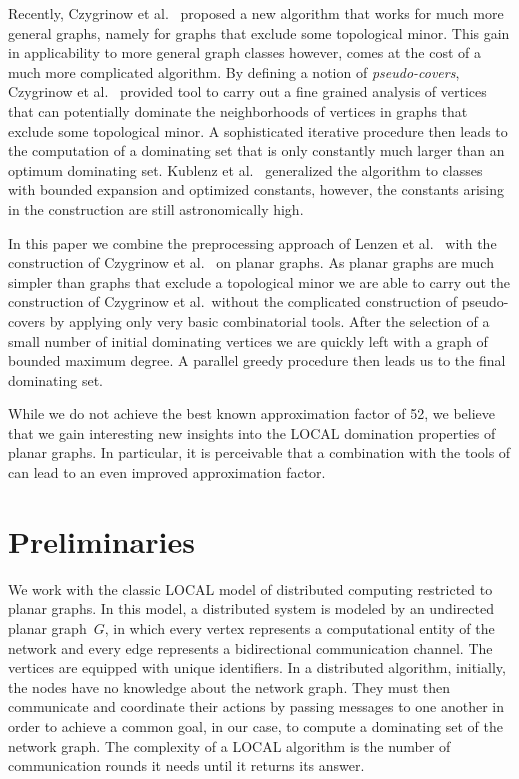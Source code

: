 \documentclass[a4paper,UKenglish,thm-restate,numberwithinsect]{lipics-v2021}
\begin{document}
Recently, Czygrinow et  al.~\cite{czygrinow2018distributed} proposed
a new algorithm that works for much more general graphs, namely
for graphs that exclude some topological minor. This gain in
applicability to more general graph classes however, comes at the
cost of a much more complicated algorithm. By defining a notion
of \emph{pseudo-covers}, Czygrinow et
al.~\cite{czygrinow2018distributed} provided tool to carry out a
fine grained analysis of vertices that can potentially dominate
the neighborhoods of vertices in graphs that exclude some topological
minor. A sophisticated iterative procedure then leads to the
computation of a dominating set that is only constantly much
larger than an optimum dominating set. Kublenz et al.~\cite{kublenz2020distributed} generalized the algorithm
to classes with bounded expansion and optimized constants,
however, the constants arising in the construction are still
astronomically high.

In this paper we combine the preprocessing approach of
Lenzen et al.~\cite{lenzen2013distributed} with the
construction of Czygrinow et al.~\cite{czygrinow2018distributed}
on planar graphs. As planar graphs are much simpler than
graphs that exclude a topological minor we are able to carry
out the construction of Czygrinow et al.\ without the
complicated construction of pseudo-covers by applying
only very basic combinatorial tools. After the selection of
a small number of initial dominating vertices we are quickly
left with a graph of bounded maximum degree. A parallel
greedy procedure then leads us to the final dominating set.

While we do not achieve the best known approximation factor
of 52, we believe that we gain interesting new insights into
the LOCAL domination properties of planar graphs. In particular,
it is perceivable that a combination with the tools of \cite{wawrzyniak2014strengthened} can lead to an
even improved approximation factor.

\section{Preliminaries}

We work with the classic LOCAL model of distributed computing
restricted to planar graphs.
In this model, a distributed system is modeled by an undirected planar
graph~$G$,
in which every vertex represents a computational entity of the network and every edge represents a bidirectional communication channel. The vertices are equipped with unique identifiers.
In a distributed algorithm, initially, the nodes have no knowledge about
the network graph. They must then communicate and coordinate
their actions by passing messages to one another in order to achieve
a common goal, in our case, to compute a dominating set of the
network graph. The complexity of a LOCAL algorithm is the number of communication rounds it needs until it returns its answer.
\end{document}
